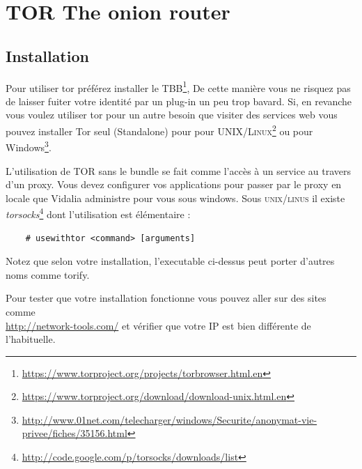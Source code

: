 \documentclass[a4paper]{article}
\begin{document}
\section{TOR The onion router}
\subsection{Installation}
Pour utiliser tor préférez installer le \textsc{TBB}\protect\footnote{\url{https://www.torproject.org/projects/torbrowser.html.en}},
De cette manière vous ne risquez pas de laisser fuiter votre identité par un plug-in un peu trop bavard.
Si, en revanche vous voulez utiliser tor pour un autre besoin que visiter des services web vous pouvez installer 
Tor seul (Standalone) pour pour \textsc{UNIX/Linux}\protect\footnote{\url{https://www.torproject.org/download/download-unix.html.en}}
ou pour Windows\protect\footnote{\url{http://www.01net.com/telecharger/windows/Securite/anonymat-vie-privee/fiches/35156.html}}.

L'utilisation de TOR sans le bundle se fait comme l'accès à un service au travers d'un proxy. Vous devez configurer vos applications
pour passer par le proxy en locale que Vidalia administre pour vous sous windows. Sous \textsc{unix/linus} il existe \emph{torsocks}\protect\footnote{\url{http://code.google.com/p/torsocks/downloads/list}}
dont l'utilisation est élémentaire :

\begin{verbatim}
    # usewithtor <command> [arguments]
\end{verbatim}
Notez que selon votre installation, l'executable ci-dessus peut porter d'autres noms comme torify.

Pour tester que votre installation fonctionne vous pouvez aller sur des sites comme\\
\url{http://network-tools.com/} et vérifier que votre IP est bien différente de l'habituelle.
\end{document}
